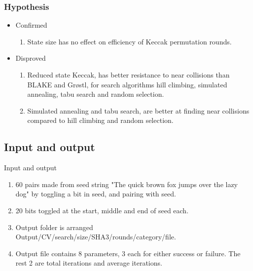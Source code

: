 \documentclass{beamer}
\begin{document}
\begin{frame}
\frametitle{Hypothesis}
\begin{itemize}
\item Confirmed
\begin{enumerate}
\item State size has no effect on efficiency of Keccak permutation rounds.
\end{enumerate}
\item Disproved
\begin{enumerate}
\item Reduced state Keccak, has better resistance to near collisions than BLAKE and Gr{\o}stl,
for search algorithms hill climbing, simulated annealing, tabu search and random selection.
\item Simulated annealing and tabu search, are better at finding near collisions compared to
hill climbing and random selection.
\end{enumerate}
\end{itemize}
\end{frame}

\subsection{Input and output}

\begin{frame}{Input and output}
\begin{enumerate}
\item 60 pairs made from seed string "The quick brown fox jumps over the lazy dog" by toggling a bit in
seed, and pairing with seed.
\item 20 bits toggled at the start, middle and end of seed each.
\item Output folder is arranged Output/CV/search/size/SHA3/rounds/category/file.
\item Output file contains 8 parameters, 3 each for either success or failure. The rest 2 are total iterations
and average iterations.
\end{enumerate}
\end{frame}
\end{document}
